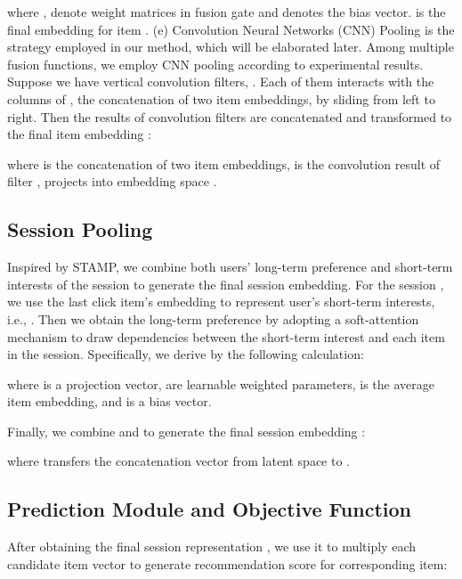 \documentclass[conference]{IEEEtran}
\begin{document}
where ,  denote weight matrices in fusion gate and  denotes the bias vector.  is the final embedding for item . (e) Convolution Neural Networks (CNN) Pooling is the strategy employed in our method, which will be elaborated later.
Among multiple fusion functions, we employ CNN pooling according to experimental results. Suppose we have  vertical convolution filters, . Each of them interacts with the columns of , the concatenation of two item embeddings, by sliding from left to right. Then the results of  convolution filters are concatenated and transformed to the final item embedding :

where  is the concatenation of two item embeddings,  is the convolution result of filter ,  projects  into embedding space .

















\subsection{Session Pooling}
Inspired by STAMP, we combine both users' long-term preference and short-term interests of the session to generate the final session embedding.
For the session , we use the last click item's embedding to represent user's short-term interests, i.e., . Then we obtain the long-term preference  by adopting a soft-attention mechanism to draw dependencies between the short-term interest  and each item in the session. Specifically, we derive  by the following calculation:

where  is a projection vector,  are learnable weighted parameters,  is the average item embedding, and  is a bias vector.

Finally, we combine  and  to generate the final session embedding :

where  transfers the concatenation vector from latent space  to .









\subsection{Prediction Module and Objective Function}
After obtaining the final session representation , we use it to multiply each candidate item vector  to generate recommendation score  for corresponding item:
\end{document}
